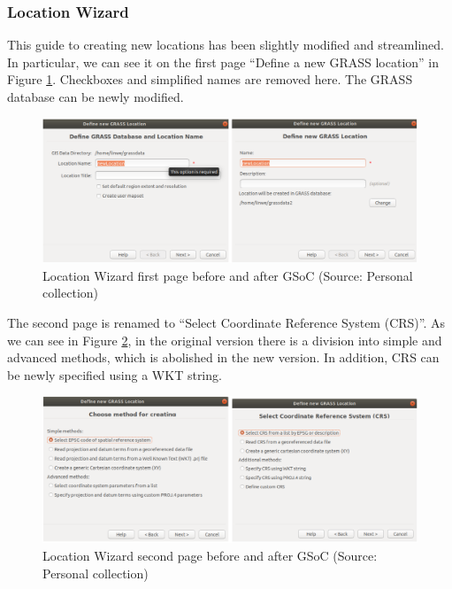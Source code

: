 \documentclass[a4paper,10pt,twoside]{article}
\begin{document}
\newpage
\vspace*{-1cm}
\subsubsection{Location Wizard}

This guide to creating new locations has been slightly modified and streamlined. In particular, we can see it on the first page ``Define a new GRASS location'' in Figure \ref{fig:loc_wiz_1}. Checkboxes and simplified names are removed here. The GRASS database can be newly modified.

\vspace{0.3cm}
\begin{figure}[hbt!] 
\begin{center}
\includegraphics[width=17cm]{../pictures/loc_wiz_1.png} 
\caption[Location Wizard first page before and after GSoC]{Location Wizard first page before and after GSoC (Source: Personal collection)}
\label{fig:loc_wiz_1}
\end{center}
\end{figure}

\noindent The second page is renamed to ``Select Coordinate Reference System (CRS)''. As we can see in Figure \ref{fig:loc_wiz_2}, in the original version there is a division into simple and advanced methods, which is abolished in the new version. In addition, CRS can be newly specified using a WKT string.

\vspace{0.3cm}
\begin{figure}[hbt!] 
\begin{center}
\includegraphics[width=17cm]{../pictures/loc_wiz_2.png} 
\caption[Location Wizard second page before and after GSoC]{Location Wizard second page before and after GSoC (Source: Personal collection)}
\label{fig:loc_wiz_2}
\end{center}
\end{figure}
\end{document}
